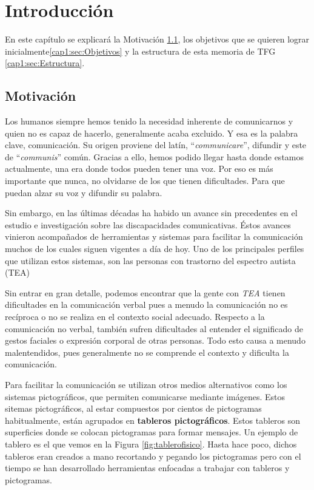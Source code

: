 \chapter{Introducción}
\label{cap:introduccion}


\begin{resumen} En este capítulo se explicará la Motivación \ref{cap1:sec:Motivacion}, los objetivos que se quieren lograr inicialmente\ref{cap1:sec:Objetivos} y la estructura de esta memoria de TFG \ref{cap1:sec:Estructura}. 
\end{resumen}
\section{Motivación}
\label{cap1:sec:Motivacion}

Los humanos siempre hemos tenido la necesidad inherente de comunicarnos y quien no es capaz de hacerlo, generalmente acaba excluido. Y esa es la palabra clave, comunicación. Su origen proviene del latín, “\textit{communicare}”, difundir y este de “\textit{communis}” común. Gracias a ello, hemos podido llegar hasta donde estamos actualmente, una era donde todos pueden tener una voz. Por eso es más importante que nunca, no olvidarse de los que tienen dificultades. Para que puedan alzar su voz y difundir su palabra.

Sin embargo, en las últimas décadas ha habido un avance sin precedentes en el estudio e investigación sobre las discapacidades comunicativas. Éstos avances vinieron acompañados de herramientas y sistemas para facilitar la comunicación muchos de los cuales siguen vigentes a día de hoy. Uno de los principales perfiles que utilizan estos sistemas, son las  personas con trastorno del espectro autista (TEA)

Sin entrar en gran detalle, podemos encontrar que la gente con \textit{TEA} tienen dificultades en la comunicación verbal pues a menudo la comunicación no es recíproca o no se realiza en el contexto social adecuado. Respecto a la comunicación no verbal, también sufren dificultades al entender el significado de gestos faciales o expresión corporal de otras personas. Todo esto causa a menudo malentendidos, pues generalmente no se comprende el contexto y dificulta la comunicación. 

Para facilitar la comunicación se utilizan otros medios alternativos como los sistemas pictográficos, que permiten comunicarse mediante imágenes. Estos sitemas pictográficos, al estar compuestos por cientos de pictogramas habitualmente, están agrupados en \textbf{tableros pictográficos}. Estos tableros son superficies donde se colocan pictogramas para formar mensajes. Un ejemplo de tablero es el que vemos en la Figura \ref{fig:tablerofisico}. Hasta hace poco, dichos tableros eran creados a mano recortando y pegando los pictogramas pero con el tiempo se han desarrollado herramientas enfocadas a trabajar con tableros y pictogramas.

